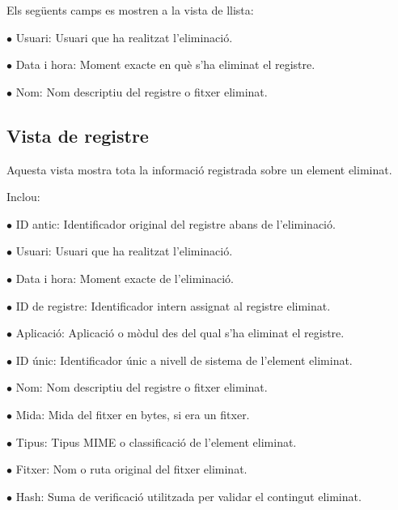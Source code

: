 \documentclass[a4paper]{article}
\begin{document}
Els següents camps es mostren a la vista de llista:

\begin{compactitem}
\item[\color{myblue}$\bullet$] Usuari: Usuari que ha realitzat l'eliminació.
\item[\color{myblue}$\bullet$] Data i hora: Moment exacte en què s'ha eliminat el registre.
\item[\color{myblue}$\bullet$] Nom: Nom descriptiu del registre o fitxer eliminat.
\end{compactitem}

\hypertarget{toc34}{}
\subsection{Vista de registre}

Aquesta vista mostra tota la informació registrada sobre un element eliminat.

Inclou:

\begin{compactitem}
\item[\color{myblue}$\bullet$] ID antic: Identificador original del registre abans de l'eliminació.
\item[\color{myblue}$\bullet$] Usuari: Usuari que ha realitzat l'eliminació.
\item[\color{myblue}$\bullet$] Data i hora: Moment exacte de l'eliminació.
\item[\color{myblue}$\bullet$] ID de registre: Identificador intern assignat al registre eliminat.
\item[\color{myblue}$\bullet$] Aplicació: Aplicació o mòdul des del qual s'ha eliminat el registre.
\item[\color{myblue}$\bullet$] ID únic: Identificador únic a nivell de sistema de l'element eliminat.
\item[\color{myblue}$\bullet$] Nom: Nom descriptiu del registre o fitxer eliminat.
\item[\color{myblue}$\bullet$] Mida: Mida del fitxer en bytes, si era un fitxer.
\item[\color{myblue}$\bullet$] Tipus: Tipus MIME o classificació de l'element eliminat.
\item[\color{myblue}$\bullet$] Fitxer: Nom o ruta original del fitxer eliminat.
\item[\color{myblue}$\bullet$] Hash: Suma de verificació utilitzada per validar el contingut eliminat.
\end{compactitem}
\end{document}
